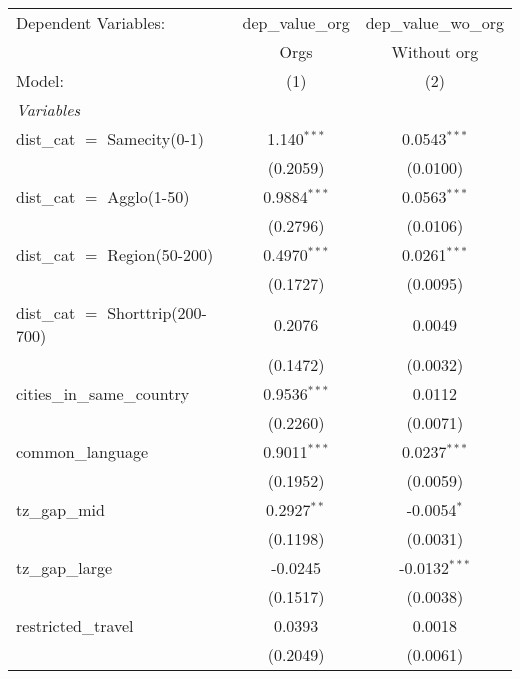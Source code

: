 \begingroup
\centering
\begin{tabular}{lcc}
   \tabularnewline \midrule \midrule
   Dependent Variables:              & dep\_value\_org   & dep\_value\_wo\_org\\     
                                     & Orgs              & Without org \\   
   Model:                            & (1)               & (2)\\  
   \midrule
   \emph{Variables}\\
   dist\_cat $=$ Samecity(0-1)       & 1.140$^{***}$     & 0.0543$^{***}$\\   
                                     & (0.2059)          & (0.0100)\\   
   dist\_cat $=$ Agglo(1-50)         & 0.9884$^{***}$    & 0.0563$^{***}$\\   
                                     & (0.2796)          & (0.0106)\\   
   dist\_cat $=$ Region(50-200)      & 0.4970$^{***}$    & 0.0261$^{***}$\\   
                                     & (0.1727)          & (0.0095)\\   
   dist\_cat $=$ Shorttrip(200-700)  & 0.2076            & 0.0049\\   
                                     & (0.1472)          & (0.0032)\\   
   cities\_in\_same\_country         & 0.9536$^{***}$    & 0.0112\\   
                                     & (0.2260)          & (0.0071)\\   
   common\_language                  & 0.9011$^{***}$    & 0.0237$^{***}$\\   
                                     & (0.1952)          & (0.0059)\\   
   tz\_gap\_mid                      & 0.2927$^{**}$     & -0.0054$^{*}$\\   
                                     & (0.1198)          & (0.0031)\\   
   tz\_gap\_large                    & -0.0245           & -0.0132$^{***}$\\   
                                     & (0.1517)          & (0.0038)\\   
   restricted\_travel                & 0.0393            & 0.0018\\   
                                     & (0.2049)          & (0.0061)\\   

\end{tabular}

